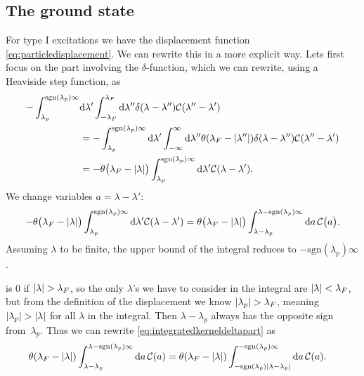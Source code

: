 \documentclass[11pt, a4paper]{report} %
\begin{document}
\subsection{The ground state}
\begin{sloppypar}
For type I excitations we have the displacement function \cref{eq:particledisplacement}.
We can rewrite this in a more explicit way.
Lets first focus on the part involving the \(\delta\)-function, which we can rewrite, using a Heaviside step function, as
\begin{align}
	- \int_{\lambda_p}^{\textrm{sgn}\qty(\lambda_p)\infty} &\dd \lambda' \int_{-\lambda_F}^{\lambda_F} \dd  \lambda'' \delta\qty(\lambda-\lambda'') \mathcal{C}\qty(\lambda''-\lambda') \\
	&=- \int_{\lambda_p}^{\textrm{sgn}\qty(\lambda_p)\infty} \dd \lambda' \int_{-\infty}^{\infty} \dd \lambda'' \theta\qty(\lambda_F - \abs{\lambda''})  \delta\qty(\lambda-\lambda'') \mathcal{C}\qty(\lambda''-\lambda')\\
	&= - \theta\qty\big(\lambda_F - \abs{\lambda}) \int_{\lambda_p}^{\textrm{sgn}\qty(\lambda_p)\infty} \dd \lambda'     \mathcal{C}\qty(\lambda-\lambda').
\end{align}
We change variables \(a=\lambda-\lambda'\):
\begin{equation}\label{eq:integratedkerneldeltapart}
	- \theta\qty\big(\lambda_F - \abs{\lambda}) \int_{\lambda_p}^{\textrm{sgn}\qty(\lambda_p)\infty} \dd \lambda'     \mathcal{C}\qty(\lambda-\lambda')=
	 \theta\qty\big(\lambda_F - \abs{\lambda}) \int_{\lambda-\lambda_p}^{\lambda - \textrm{sgn}\qty(\lambda_p)\infty} \dd a\,\mathcal{C}\qty\big(a).
\end{equation}
Assuming \(\lambda\) to be finite, the upper bound of the integral reduces to \(-\textrm{sgn}(\lambda_p)\infty\).
\end{sloppypar}

 is 0 if \(\abs{\lambda} > \lambda_F\), so the only \(\lambda\)'s we have to consider in the integral are \(\abs{\lambda}< \lambda_F\), but from the definition of the displacement we know \(\abs{\lambda_p}  >\lambda_F\), meaning \(\abs{\lambda_p} > \abs{\lambda}\) for all \(\lambda\) in the integral.
Then \(\lambda-\lambda_p\) always has the opposite sign from~\(\lambda_p\).
Thus we can rewrite \cref{eq:integratedkerneldeltapart} as
\begin{align}
	\theta\qty(\lambda_F - \abs{\lambda}) \int_{\lambda-\lambda_p}^{\lambda - \textrm{sgn}\qty(\lambda_p)\infty} \dd a\,\mathcal{C}\qty(a) &=
	\theta(\lambda_F - \abs{\lambda}) \int_{-\textrm{sgn}\qty(\lambda_p)\abs{\lambda-\lambda_p}}^{ - \textrm{sgn}\qty(\lambda_p)\infty} \dd a\,\mathcal{C}\qty(a).
\end{align}
\end{document}
